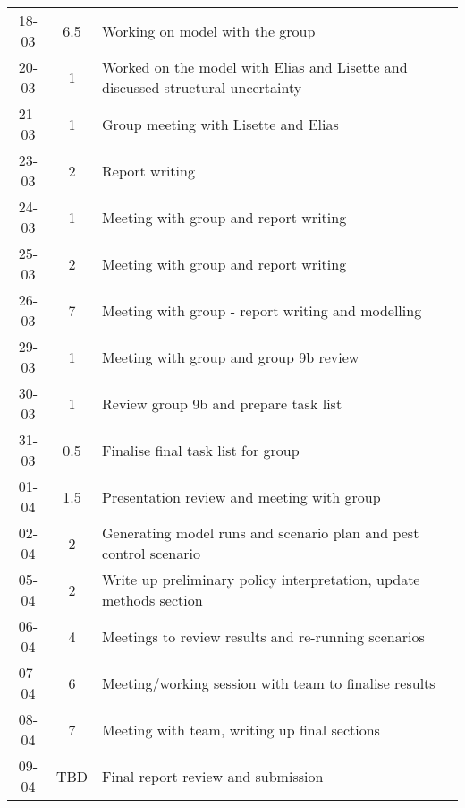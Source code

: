 \begin{longtable}[c]{c|c|m{35em}}
 18-03 & 6.5  & Working on model with the group \\
 20-03 & 1 & Worked on the model with Elias and Lisette and discussed structural uncertainty \\
 21-03 & 1 & Group meeting with Lisette and Elias\\
 23-03 & 2 & Report writing\\
 24-03 & 1 & Meeting with group and report writing\\
 25-03 & 2 & Meeting with group and report writing\\
 26-03 & 7 & Meeting with group - report writing and modelling\\
 29-03 & 1 & Meeting with group and group 9b review\\
 30-03 & 1 & Review group 9b and prepare task list\\
 31-03 & 0.5 & Finalise final task list for group\\
 01-04 & 1.5 & Presentation review and meeting with group\\
 02-04 & 2 & Generating model runs and scenario plan and pest control scenario\\
 05-04 & 2 & Write up preliminary policy interpretation, update methods section\\
 06-04 & 4 & Meetings to review results and re-running scenarios\\
 07-04 & 6 & Meeting/working session with team to finalise results\\
 08-04 & 7 & Meeting with team, writing up final sections\\
 09-04 & TBD & Final report review and submission
 

\end{longtable}

